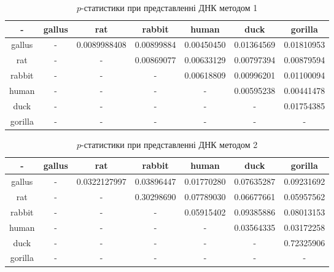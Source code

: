 \documentclass[14pt,a4paper,titlepage]{extarticle}
\begin{document}
\newpage
\begin{table}[h!]
\begin{center}
\begin{tabular}{|c|c|c|c|c|c|c|}
\hline
- & gallus & rat & rabbit & human & duck & gorilla \\ \hline
gallus & - & 0.0089988408 & 0.00899884 & 0.00450450 & 0.01364569 & 0.01810953 \\ \hline
rat & - & - & 0.00869077 & 0.00633129 & 0.00797394 & 0.00879594 \\ \hline
rabbit & - & - & - & 0.00618809 & 0.00996201 & 0.01100094 \\ \hline
human & - & - & - & - & 0.00595238 & 0.00441478 \\ \hline
duck & - & - & - & - & - & 0.01754385 \\ \hline
gorilla & - & - & - & - & - & - \\ \hline
\end{tabular}
\end{center}
\caption{$p$-статистики при представленні ДНК методом 1}
\label{table:res1}
\end{table}

\begin{table}[h!]
\begin{center}
\begin{tabular}{|c|c|c|c|c|c|c|}
\hline
- & gallus & rat & rabbit & human & duck & gorilla \\ \hline
gallus & - & 0.0322127997 & 0.03896447 & 0.01770280 & 0.07635287 & 0.09231692 \\ \hline
rat & - & - & 0.30298690 & 0.07789030 & 0.06677661 & 0.05957562 \\ \hline
rabbit & - & - & - & 0.05915402 & 0.09385886 & 0.08013153 \\ \hline
human & - & - & - & - & 0.03564335 & 0.03172258 \\ \hline
duck & - & - & - & - & - & 0.72325906 \\ \hline
gorilla & - & - & - & - & - & - \\ \hline
\end{tabular}
\end{center}
\caption{$p$-статистики при представленні ДНК методом 2}
\label{table:res2}
\end{table}

\newpage
\end{document}
